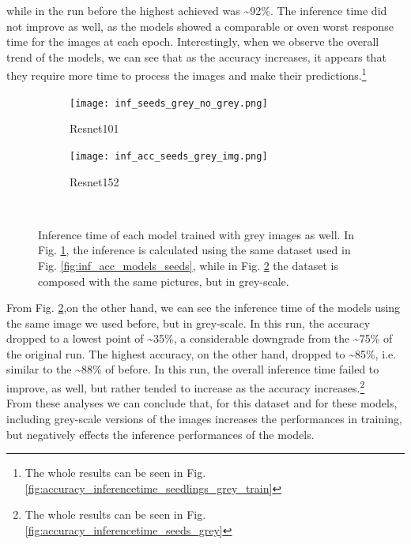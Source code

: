 while in the run before the highest achieved was \textasciitilde92\%. The inference time did not improve as well, as the models showed a comparable or oven worst response time for the images at each epoch. Interestingly, when we observe the overall trend of the models, we can see that as the accuracy increases, it appears that they require more time to process the images and make their predictions.\footnote{The whole results can be seen in Fig. \ref{fig:accuracy_inferencetime_seedlings_grey_train}}\\


\begin{figure}[h]
     \begin{subfigure}{0.5\textwidth}
	    \texttt{[image: inf\_seeds\_grey\_no\_grey.png]}
	    \caption{Resnet101}
         \label{fig:inf_seeds_grey_no_grey}
     \end{subfigure}
     \hfill
     \begin{subfigure}{0.5\textwidth}
	    \texttt{[image: inf\_acc\_seeds\_grey\_img.png]}
	    \caption{Resnet152}
        \label{fig:inf_acc_seeds_grey_img}
     \end{subfigure}\\
     \caption[Inference time of each model trained with grey images as well]{Inference time of each model trained with grey images as well. In Fig. \ref{fig:inf_seeds_grey_no_grey}, the inference is calculated using the same dataset used in Fig. \ref{fig:inf_acc_models_seeds}, while in Fig.  \ref{fig:inf_acc_seeds_grey_img} the dataset is composed with the same pictures, but in grey-scale. }
        \label{fig:inf_seeds_with_grey}
\end{figure}


From Fig. \ref{fig:inf_acc_seeds_grey_img},on the other hand, we can see the inference time of the models using the same image we used before, but in grey-scale. In this run, the accuracy dropped to a lowest point of \textasciitilde35\%, a considerable downgrade from the \textasciitilde75\% of the original run. The highest accuracy, on the other hand, dropped to \textasciitilde85\%, i.e. similar to the \textasciitilde88\% of before. In this run, the overall inference time failed to improve, as well, but rather tended to increase as the accuracy increases.\footnote{The whole results can be seen in Fig. \ref{fig:accuracy_inferencetime_seeds_grey}} \\

From these analyses we can conclude that, for this dataset and for these models, including grey-scale versions of the images increases the performances in training, but negatively effects the inference performances of the models. 
